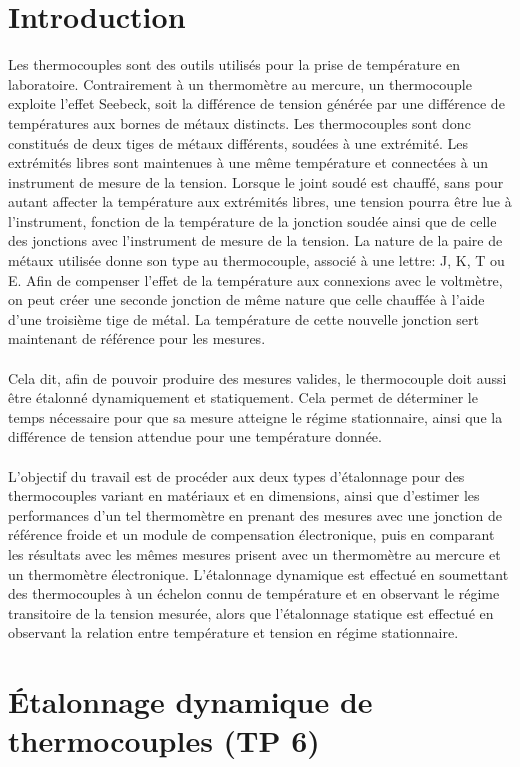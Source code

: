\documentclass[11pt,twoside]{article}
\numberwithin{figure}{section}
\begin{document}
\section{Introduction}
Les thermocouples sont des outils utilisés pour la prise de température en laboratoire. Contrairement à un thermomètre au mercure, un thermocouple exploite l'effet Seebeck, soit la différence de tension générée par une différence de températures aux bornes de métaux distincts. Les thermocouples sont donc constitués de deux tiges de métaux différents, soudées à une extrémité. Les extrémités libres sont maintenues à une même température et connectées à un instrument de mesure de la tension. Lorsque le joint soudé est chauffé, sans pour autant affecter la température aux extrémités libres, une tension pourra être lue à l'instrument, fonction de la température de la jonction soudée ainsi que de celle des jonctions avec l'instrument de mesure de la tension. La nature de la paire de métaux utilisée donne son type au thermocouple, associé à une lettre: J, K, T ou E. Afin de compenser l'effet de la température aux connexions avec le voltmètre, on peut créer une seconde jonction de même nature que celle chauffée à l'aide d'une troisième tige de métal. La température de cette nouvelle jonction sert maintenant de référence pour les mesures.\cite{Lemay2017}
\\
\\
Cela dit, afin de pouvoir produire des mesures valides, le thermocouple doit aussi être étalonné dynamiquement et statiquement. Cela permet de déterminer le temps nécessaire pour que sa mesure atteigne le régime stationnaire, ainsi que la différence de tension attendue pour une température donnée.
\\
\\
L'objectif du travail est de procéder aux deux types d'étalonnage pour des thermocouples variant en matériaux et en dimensions, ainsi que d'estimer les performances d'un tel thermomètre en prenant des mesures avec une jonction de référence froide et un module de compensation électronique, puis en comparant les résultats avec les mêmes mesures prisent avec un thermomètre au mercure et un thermomètre électronique. L'étalonnage dynamique est effectué en soumettant des thermocouples à un échelon connu de température et en observant le régime transitoire de la tension mesurée, alors que l'étalonnage statique est effectué en observant la relation entre température et tension en régime stationnaire.

\newpage
\section{Étalonnage dynamique de thermocouples (TP 6)}
\thispagestyle{empty}
\end{document}
